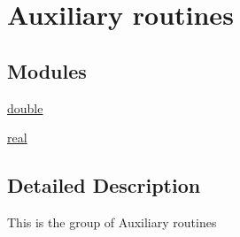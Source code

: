 \hypertarget{group__auxiliaryGT}{}\section{Auxiliary routines}
\label{group__auxiliaryGT}
\subsection*{Modules}
\begin{DoxyCompactItemize}
\item 
\hyperlink{group__doubleGTauxiliary}{double}
\item 
\hyperlink{group__realGTauxiliary}{real}
\end{DoxyCompactItemize}


\subsection{Detailed Description}
This is the group of Auxiliary routines 